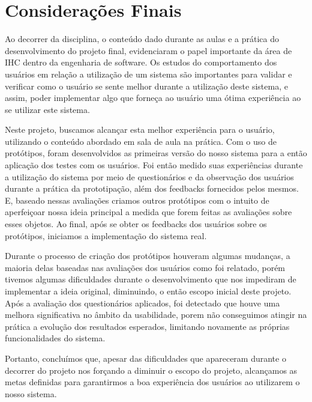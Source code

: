 \chapter[Considerações Finais]{Considerações Finais}

Ao decorrer da disciplina, o conteúdo dado durante as aulas e a prática do desenvolvimento do projeto final, evidenciaram o papel importante da área de IHC dentro da engenharia de software. Os estudos do comportamento dos usuários em relação a utilização de um sistema são importantes para validar e verificar como o usuário se sente melhor durante a utilização deste sistema, e assim, poder implementar algo que forneça ao usuário uma ótima experiência ao se utilizar este sistema. 

Neste projeto, buscamos alcançar esta melhor experiência para o usuário, utilizando o conteúdo abordado em sala de aula na prática. Com o uso de protótipos, foram desenvolvidos as primeiras versão do nosso sistema para a então aplicação dos testes com os usuários. Foi então medido suas experiências durante a utilização do sistema por meio de questionários e da observação dos usuários durante a prática da prototipação, além dos feedbacks fornecidos pelos mesmos. E, baseado nessas avaliações criamos outros protótipos com o intuito de aperfeiçoar nossa ideia principal a medida que forem feitas as avaliações sobre esses objetos. Ao final, após se obter os feedbacks dos usuários sobre os protótipos, iniciamos a implementação do sistema real.

Durante o processo de criação dos protótipos houveram algumas mudanças, a maioria delas baseadas nas avaliações dos usuários como foi relatado, porém tivemos algumas dificuldades durante o desenvolvimento que nos impediram de implementar a ideia original, diminuindo, o então escopo inicial deste projeto. Após a avaliação dos questionários aplicados, foi detectado que houve uma melhora significativa no âmbito da usabilidade, porem não conseguimos atingir na prática a evolução dos resultados esperados, limitando novamente as próprias funcionalidades do sistema.
 
Portanto, concluímos que, apesar das dificuldades que apareceram durante o decorrer do projeto nos forçando a diminuir o escopo do projeto, alcançamos as metas definidas para garantirmos a boa experiência dos usuários ao utilizarem o nosso sistema.